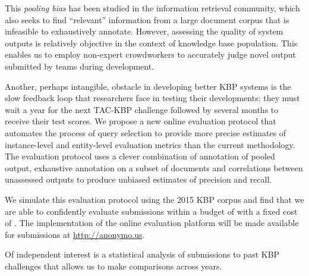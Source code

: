 This \emph{pooling bias} has been studied in the information retrieval community\needcite,
which also seeks to find ``relevant'' information from a large document corpus that is infeasible to exhaustively annotate.
However, assessing the quality of system outputs is relatively objective in the context of knowledge base population.
This enables us to employ non-expert crowdworkers to accurately judge novel output submitted by teams during development.

Another, perhaps intangible, obstacle in developing better KBP systems is the slow feedback loop that researchers face in testing their developments: they must wait a year for the next TAC-KBP challenge followed by several months to receive their test scores.
We propose a new online evaluation protocol that automates the process of query selection to provide more precise estimates of instance-level and entity-level evaluation metrics than the current methodology.
The evaluation protocol uses a clever combination of annotation of pooled output, exhaustive annotation on a subset of documents and correlations between unassessed outputs to produce unbiased estimates of precision and recall.

We simulate this evaluation protocol using the 2015 KBP corpus and find that we are able to confidently evaluate submissions within a budget of  with a fixed cost of .
The implementation of the online evaluation platform will be made available for submissions at \url{http://anonymo.us}.

Of independent interest is a statistical analysis of submissions to past KBP challenges that allows us to make comparisons across years.



